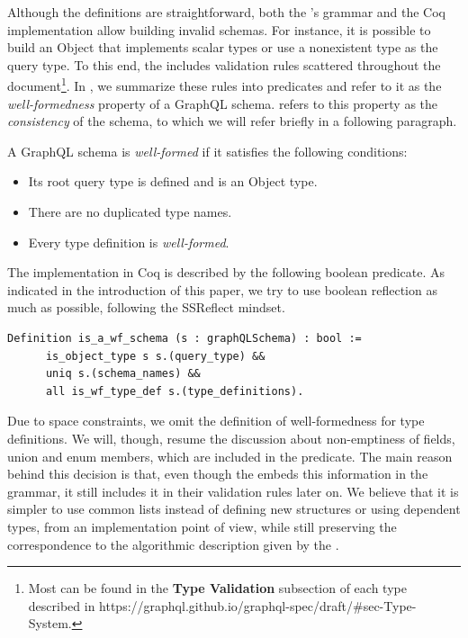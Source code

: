 
Although the definitions are straightforward, both the \spec{}'s grammar and the Coq implementation allow building invalid schemas. For instance, it is possible to build an Object that implements scalar types or use a nonexistent type as the query type. To this end, the \spec{} includes validation rules scattered throughout the document\footnote{Most can be found in the \textbf{Type Validation} subsection of each type described in https://graphql.github.io/graphql-spec/draft/\#sec-Type-System.}. In \coql, we summarize these rules into predicates and refer to it as the \textit{well-formedness} property of a GraphQL schema. \HP{} refers to this property as the \textit{consistency} of the schema, to which we will refer briefly in a following paragraph.


\begin{definition}
A GraphQL schema is \textit{well-formed} if it satisfies the following conditions:
\begin{itemize}
    \item Its root query type is defined and is an Object type.
    \item There are no duplicated type names.
    \item Every type definition is \textit{well-formed}.
\end{itemize}
\end{definition}

The implementation in Coq is described by the following boolean predicate. As indicated in the introduction of this paper, we try to use boolean reflection as much as possible, following the SSReflect mindset.

\begin{verbatim}
Definition is_a_wf_schema (s : graphQLSchema) : bool :=
      is_object_type s s.(query_type) &&
      uniq s.(schema_names) &&
      all is_wf_type_def s.(type_definitions).
\end{verbatim}

Due to space constraints, we omit the definition of well-formedness for type definitions. We will, though, resume the discussion about non-emptiness of fields, union and enum members, which are included in the predicate. The main reason behind this decision is that, even though the \spec{} embeds this information in the grammar, it still includes it in their validation rules later on. We believe that it is simpler to use common lists instead of defining new structures or using dependent types, from an implementation point of view, while still preserving the correspondence to the algorithmic description given by the \spec{}.

